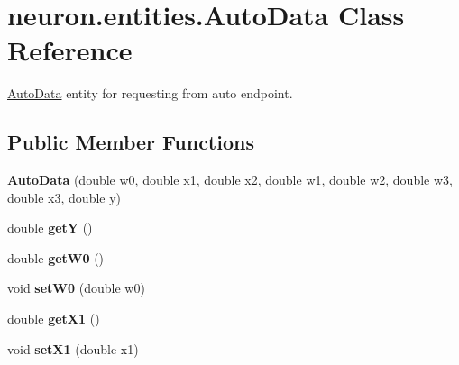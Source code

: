 \hypertarget{classneuron_1_1entities_1_1AutoData}{}\section{neuron.\+entities.\+Auto\+Data Class Reference}
\label{classneuron_1_1entities_1_1AutoData}


\hyperlink{classneuron_1_1entities_1_1AutoData}{Auto\+Data} entity for requesting from auto endpoint.  


\subsection*{Public Member Functions}
\begin{DoxyCompactItemize}
\item 
\mbox{\label{classneuron_1_1entities_1_1AutoData_a5e7422baa51ea8b9faee90f196962a14}} 
{\bfseries Auto\+Data} (double w0, double x1, double x2, double w1, double w2, double w3, double x3, double y)
\item 
\mbox{\label{classneuron_1_1entities_1_1AutoData_a12289893ee0e248c800c86de81427513}} 
double {\bfseries getY} ()
\item 
\mbox{\label{classneuron_1_1entities_1_1AutoData_a017402ca8ec19193150dffef53a8461a}} 
double {\bfseries get\+W0} ()
\item 
\mbox{\label{classneuron_1_1entities_1_1AutoData_a2a2ed8590726390b258f19dde06ede87}} 
void {\bfseries set\+W0} (double w0)
\item 
\mbox{\label{classneuron_1_1entities_1_1AutoData_a710515a11c52f88f4939826364f94274}} 
double {\bfseries get\+X1} ()
\item 
\mbox{\label{classneuron_1_1entities_1_1AutoData_a56c9f508694189eed8d4446c4072d214}} 
void {\bfseries set\+X1} (double x1)
\item 
\mbox{\label{classneuron_1_1entities_1_1AutoData_aef728a980771991ecf55553522e488d1}} 

\end{DoxyCompactItemize}
